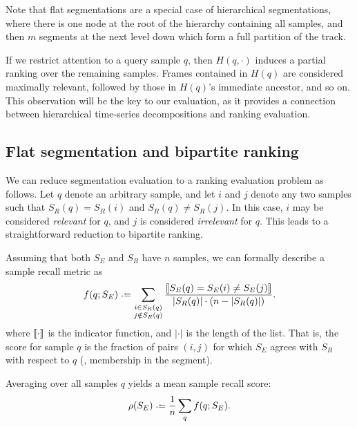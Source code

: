 \documentclass{article}
\begin{document}
Note that flat segmentations are a special case of hierarchical segmentations, where there is one node at the root of the hierarchy containing all samples, and then $m$ segments at the next level down which form a full partition of the track.

If we restrict attention to a query sample $q$, then $H(q, \cdot)$ induces a partial ranking over the remaining samples.
Frames contained in $H(q)$ are considered maximally relevant, followed by those in $H(q)$'s immediate ancestor, and so on.
This observation will be the key to our evaluation, as it provides a connection between hierarchical time-series decompositions and ranking evaluation.

\subsection{Flat segmentation and bipartite ranking}

We can reduce segmentation evaluation to a ranking evaluation problem as follows.
Let $q$ denote an arbitrary sample, and let $i$ and $j$ denote any two samples such that $S_R(q) = S_R(i)$ and $S_R(q) \neq S_R(j)$.
In this case, $i$ may be considered \emph{relevant} for $q$, and $j$ is considered \emph{irrelevant} for $q$.
This leads to a straightforward reduction to bipartite ranking.

Assuming that both $S_E$ and $S_R$ have $n$ samples, we can formally describe a sample 
recall metric as
\begin{equation}
f(q ; S_E) \defeq 
\sum_{\substack{i \in S_R(q)\\ j \notin S_R(q)}}
\frac{\ind{S_E(q) = S_E(i) \neq S_E(j) }}{|S_R(q)|\cdot (n -
|S_R(q)|)}.\label{flatrecall}
\end{equation}
where $\left\llbracket\cdot\right\rrbracket$ is the indicator function, and $|\cdot|$ is the length of the list.
That is, the score for sample $q$ is the fraction of pairs $(i, j)$ for which $S_E$
agrees with $S_R$ with respect to $q$ (\ie, membership in the segment).

Averaging over all samples $q$ yields a mean sample recall score:
\begin{equation}
\rho(S_E) \defeq \frac{1}{n} \sum_q f(q ; S_E).\label{avgrecall}
\end{equation}
\nocite{levy2008structural}
\end{document}
